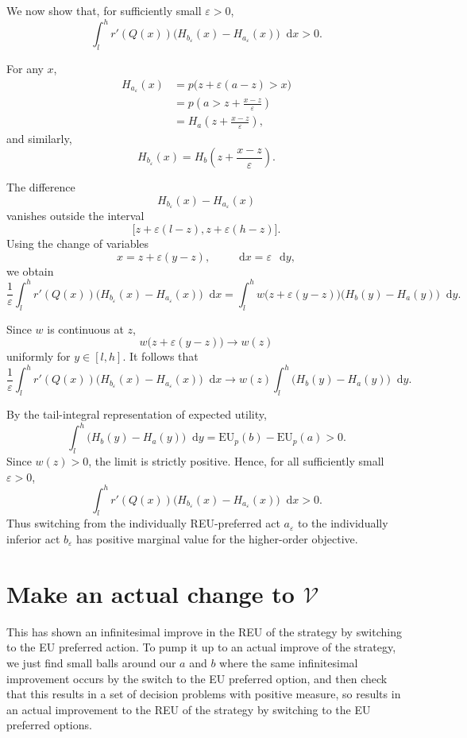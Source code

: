 \documentclass[a4paper,final]{article}
\newcommand\EU{\mathrm{EU}}
\newcommand*\diff{\mathop{}\!\mathrm{d}}
\newenvironment{CCM rewritten}
{\begingroup\color{blue}} %
{\endgroup}              %
\begin{document}
We now show that, for sufficiently small \(\varepsilon>0\),
\[
\int_l^h
r'(Q(x))
\bigl(
H_{b_\varepsilon}(x)-H_{a_\varepsilon}(x)
\bigr)
\diff x
>0.
\]

For any \(x\),
\[
\begin{aligned}
H_{a_\varepsilon}(x)
&=
p\bigl(z+\varepsilon(a-z)>x\bigr)\\
&=
p\left(
a>z+\frac{x-z}{\varepsilon}
\right)\\
&=
H_a\left(
z+\frac{x-z}{\varepsilon}
\right),
\end{aligned}
\]
and similarly,
\[
H_{b_\varepsilon}(x)
=
H_b\left(
z+\frac{x-z}{\varepsilon}
\right).
\]

The difference
\[
H_{b_\varepsilon}(x)-H_{a_\varepsilon}(x)
\]
vanishes outside the interval
\[
\bigl[
z+\varepsilon(l-z),
z+\varepsilon(h-z)
\bigr].
\]
Using the change of variables
\[
x=z+\varepsilon(y-z),
\qquad
\diff x=\varepsilon\,\diff y,
\]
we obtain
\[
\frac{1}{\varepsilon}
\int_l^h
r'(Q(x))
\bigl(
H_{b_\varepsilon}(x)-H_{a_\varepsilon}(x)
\bigr)
\diff x
=
\int_l^h
w\bigl(z+\varepsilon(y-z)\bigr)
\bigl(
H_b(y)-H_a(y)
\bigr)
\diff y.
\]

Since \(w\) is continuous at \(z\),
\[
w\bigl(z+\varepsilon(y-z)\bigr)
\longrightarrow
w(z)
\]
uniformly for \(y\in[l,h]\). It follows that
\[
\frac{1}{\varepsilon}
\int_l^h
r'(Q(x))
\bigl(
H_{b_\varepsilon}(x)-H_{a_\varepsilon}(x)
\bigr)
\diff x
\longrightarrow
w(z)
\int_l^h
\bigl(
H_b(y)-H_a(y)
\bigr)
\diff y.
\]

By the tail-integral representation of expected utility,
\[
\int_l^h
\bigl(
H_b(y)-H_a(y)
\bigr)
\diff y
=
\EU_p(b)-\EU_p(a)
>0.
\]
Since \(w(z)>0\), the limit is strictly positive. Hence, for all
sufficiently small \(\varepsilon>0\),
\[
\int_l^h
r'(Q(x))
\bigl(
H_{b_\varepsilon}(x)-H_{a_\varepsilon}(x)
\bigr)
\diff x
>0.
\]
Thus switching from the individually REU-preferred act
\(a_\varepsilon\) to the individually inferior act
\(b_\varepsilon\) has positive marginal value for the higher-order
objective.


\section{Make an actual change to $\mathcal{V}$}
This has shown an infinitesimal improve in the REU of the strategy by switching to the EU preferred action. To pump it up to an actual improve of the strategy, we just find small balls around our $a$ and $b$ where the same infinitesimal improvement occurs by the switch to the EU preferred option, and then check that this results in a set of decision problems with positive measure, so results in an actual improvement to the REU of the strategy by switching to the EU preferred options.  
\end{document}
